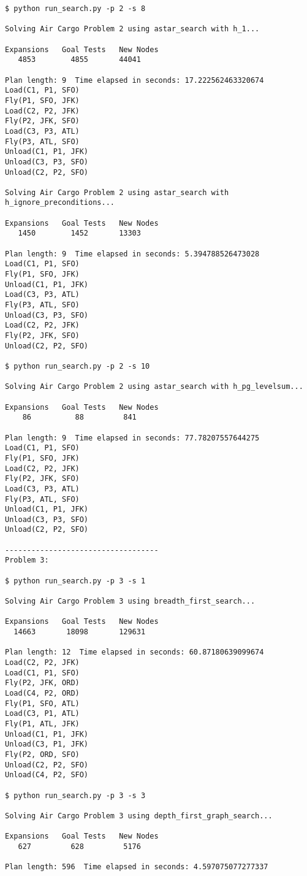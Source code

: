 \documentclass[11pt]{scrartcl}
\begin{document}
\begin{verbatim}
$ python run_search.py -p 2 -s 8

Solving Air Cargo Problem 2 using astar_search with h_1...

Expansions   Goal Tests   New Nodes
   4853        4855       44041

Plan length: 9  Time elapsed in seconds: 17.222562463320674
Load(C1, P1, SFO)
Fly(P1, SFO, JFK)
Load(C2, P2, JFK)
Fly(P2, JFK, SFO)
Load(C3, P3, ATL)
Fly(P3, ATL, SFO)
Unload(C1, P1, JFK)
Unload(C3, P3, SFO)
Unload(C2, P2, SFO)

Solving Air Cargo Problem 2 using astar_search with h_ignore_preconditions...

Expansions   Goal Tests   New Nodes
   1450        1452       13303

Plan length: 9  Time elapsed in seconds: 5.394788526473028
Load(C1, P1, SFO)
Fly(P1, SFO, JFK)
Unload(C1, P1, JFK)
Load(C3, P3, ATL)
Fly(P3, ATL, SFO)
Unload(C3, P3, SFO)
Load(C2, P2, JFK)
Fly(P2, JFK, SFO)
Unload(C2, P2, SFO)

$ python run_search.py -p 2 -s 10

Solving Air Cargo Problem 2 using astar_search with h_pg_levelsum...

Expansions   Goal Tests   New Nodes
    86          88         841

Plan length: 9  Time elapsed in seconds: 77.78207557644275
Load(C1, P1, SFO)
Fly(P1, SFO, JFK)
Load(C2, P2, JFK)
Fly(P2, JFK, SFO)
Load(C3, P3, ATL)
Fly(P3, ATL, SFO)
Unload(C1, P1, JFK)
Unload(C3, P3, SFO)
Unload(C2, P2, SFO)

-----------------------------------
Problem 3: 

$ python run_search.py -p 3 -s 1

Solving Air Cargo Problem 3 using breadth_first_search...

Expansions   Goal Tests   New Nodes
  14663       18098       129631

Plan length: 12  Time elapsed in seconds: 60.87180639099674
Load(C2, P2, JFK)
Load(C1, P1, SFO)
Fly(P2, JFK, ORD)
Load(C4, P2, ORD)
Fly(P1, SFO, ATL)
Load(C3, P1, ATL)
Fly(P1, ATL, JFK)
Unload(C1, P1, JFK)
Unload(C3, P1, JFK)
Fly(P2, ORD, SFO)
Unload(C2, P2, SFO)
Unload(C4, P2, SFO)

$ python run_search.py -p 3 -s 3

Solving Air Cargo Problem 3 using depth_first_graph_search...

Expansions   Goal Tests   New Nodes
   627         628         5176

Plan length: 596  Time elapsed in seconds: 4.597075077277337


\end{verbatim}
\end{document}
